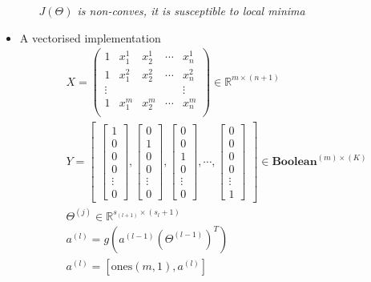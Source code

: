 \begin{itemize}
\begin{enumerate}
        \emph{\textcolor{Bittersweet}{$J(\Theta)$ is non-conves, it is susceptible to local minima}}
    \end{enumerate}    
\item
A vectorised implementation\\
\begin{align*}
&X = \begin{pmatrix} 
    1 & x_1^1 & x_2^1 & \cdots & x_n^1 \\
    1 & x_1^2 & x_2^2 & \cdots & x_n^2 \\
    \vdots &&&& \vdots \\
    1 & x_1^m & x_2^m & \cdots & x_n^m \\
     \end{pmatrix} 
\in \mathbb{R}^{m \times (n+1)}\\
&Y = \begin{bmatrix}
   \begin{bmatrix} 1\\ 0\\ 0\\ 0 \\ \vdots \\ 0\end{bmatrix}, \begin{bmatrix} 0\\ 1\\ 0\\ 0 \\  \vdots \\ 0\end{bmatrix}, \begin{bmatrix} 0\\ 0\\ 1\\ 0 \\  \vdots \\ 0 \end{bmatrix}, \cdots, \begin{bmatrix} 0\\ 0\\ 0\\ 0 \\  \vdots \\ 1 \end{bmatrix}
\end{bmatrix}
\in \textbf{Boolean}^{(m)\times(K)}\\
&\Theta^{(j)} \in \mathbb{R}^{s_{(l+1)} \times (s_l +1)}\\
&a^{(l)} = g(a^{(l-1)}{(\Theta^{(l-1)})}^{T})\\
&a^{(l)} = [\text{ones}(m,1), a^{(l)}]\\

\end{align*}
\end{itemize}
